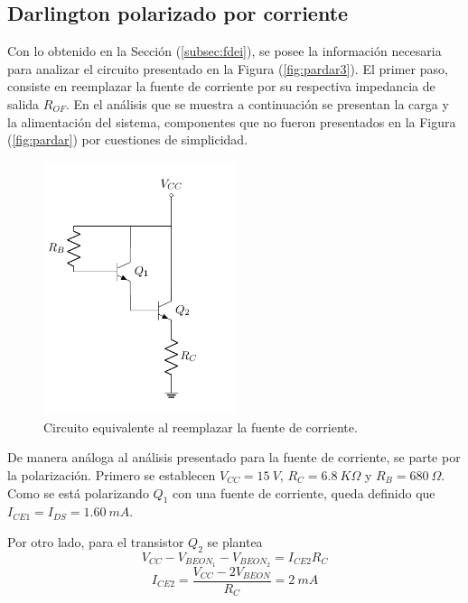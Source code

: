 \subsection{Darlington polarizado por corriente}
Con lo obtenido en la Sección (\ref{subsec:fdei}), se posee la información necesaria para analizar el circuito presentado en la Figura (\ref{fig:pardar3}). El primer paso, consiste en reemplazar la fuente de corriente por su respectiva impedancia de salida $R_{OF}$. En el análisis que se muestra a continuación se presentan la carga y la alimentación del sistema, componentes que no fueron presentados en la Figura (\ref{fig:pardar}) por cuestiones de simplicidad.
\begin{figure}[H]
\centering
	\includegraphics[width=0.5\textwidth, page=5]{Imagenes/ParDarlington.pdf}
	\caption{Circuito equivalente al reemplazar la fuente de corriente.}
	\label{fig:pardar4}
\end{figure}

De manera análoga al análisis presentado para la fuente de corriente, se parte por la polarización. Primero se establecen $V_{CC} = 15 \ V$, $R_C = 6.8 \ K\Omega$ y $R_B = 680 \ \Omega$. Como se está polarizando $Q_1$ con una fuente de corriente, queda definido que $I_{CE1} = I_{DS} = 1.60 \ mA$.

Por otro lado, para el transistor $Q_2$ se plantea
\begin{equation*}
	V_{CC} - V_{BEON_1} - V_{BEON_2} = I_{CE2} R_{C}
\end{equation*}
\begin{equation}
	I_{CE2} = \frac{V_{CC} - 2 V_{BEON}}{R_{C}} = 2 \ mA
\end{equation}

